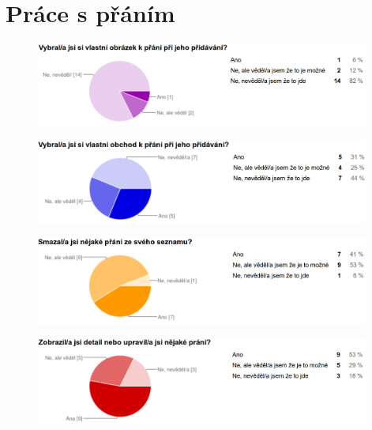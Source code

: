 \section{Práce s přáním}
\begin{figure}[H]
\begin{center}
\includegraphics[width=110mm]{./pictures/dotaznik/jedno-prani-01.png}
\label{fig:dot:jedno-prani-01}
\end{center}
\end{figure}

\begin{figure}[H]
\begin{center}
\includegraphics[width=110mm]{./pictures/dotaznik/jedno-prani-02.png}
\label{fig:dot:jedno-prani-02}
\end{center}
\end{figure}

\begin{figure}[H]
\begin{center}
\includegraphics[width=110mm]{./pictures/dotaznik/jedno-prani-03.png}
\label{fig:dot:jedno-prani-03}
\end{center}
\end{figure}

\begin{figure}[H]
\begin{center}
\includegraphics[width=110mm]{./pictures/dotaznik/jedno-prani-04.png}
\label{fig:dot:jedno-prani-04}
\end{center}
\end{figure}

